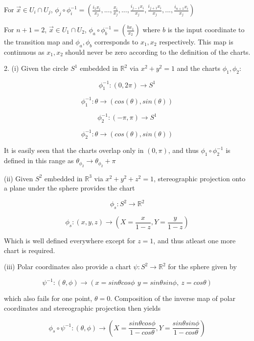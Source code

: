 \documentclass{article}\usepackage[]{graphicx}\usepackage[]{color}
\begin{document}
For $\vec{x}\in U_i\cap U_j$, $\phi_j\circ\phi_i^{-1}=
\left(\frac{i_1 x_i}{x_j},...,\frac{x_i}{x_j} ,...,\frac{i_{j-1}x_i}{x_j},\frac{i_{j+1}x_i}{x_j},...,\frac{i_{n+1}x_i}{x_j}\right)
$

For $n+1=2$, $\vec{x}\in U_1\cap U_2$, $\phi_a\circ\phi_b^{-1}=
\left(\frac{bx_1}{x_2}\right) 
$ where $b$ is the input coordinate to the transition map and $\phi_a,\phi_b$ corresponds to $x_1,x_2$ respectively. This map is continuous as $x_1,x_2$ should never be zero according to the definition of the charts.

2. (i) Given the circle $S^1$ embedded in $\mathbb{R}^2$ via $x^2+y^2=1$ and the charts $\phi_1 ,\phi_2$:

$$
\phi_1^{-1}: (0,2\pi )\rightarrow S^1
$$

\vspace{-.3cm}

$$
\phi_1^{-1}: \theta \rightarrow (cos(\theta ),sin(\theta ))
$$

\medskip

$$
\phi_2^{-1}: (-\pi ,\pi )\rightarrow S^1
$$

\vspace{-.3cm}

$$
\phi_2^{-1}: \theta \rightarrow (cos(\theta ),sin(\theta ))
$$

It is easily seen that the charts overlap only in $(0,\pi )$, and thus $\phi_1\circ\phi_2^{-1}$ is defined in this range as $\theta_{\phi_2}\rightarrow\theta_{\phi_2}+\pi$

(ii) Given $S^2$ embedded in $\mathbb{R}^3$ via $x^2+y^2+z^2=1$, stereographic projection onto a plane under the sphere provides the chart

 $$\phi_s:S^2\rightarrow \mathbb{R}^2$$

 $$\phi_s:(x,y,z)\rightarrow (X=\frac{x}{1-z},Y=\frac{y}{1-z})
 $$
 
Which is well defined everywhere except for $z=1$, and thus atleast one more chart is required.

(iii) Polar coordinates also provide a chart $\psi:S^2\rightarrow \mathbb{R}^2$ for the sphere given by 

$$
\psi^{-1}: (\theta ,\phi)\rightarrow(x=sin\theta cos\phi\,\ y=sin\theta sin\phi, \ z=cos\theta)
$$

which also fails for one point, $\theta=0$. Composition of the inverse map of polar coordinates and stereographic projection then yields

$$
\phi_s\circ\psi^{-1} :(\theta,\phi)\rightarrow (X=\frac{sin\theta cos\phi}{1-cos\theta},Y=\frac{sin\theta sin\phi}{1-cos\theta})
$$
\end{document}
